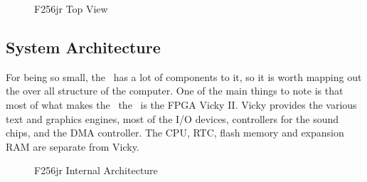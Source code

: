 \begin{figure}[ht]
    \begin{center}
    \end{center}
    \caption{F256jr Top View}
    \label{fig:top}
\end{figure}

\subsection*{System Architecture}

For being so small, the \foenix\ has a lot of components to it, so it
is worth mapping out the over all structure of the computer. One of
the main things to note is that most of what makes the \foenix\ the
\foenix\ is the FPGA Vicky II. Vicky provides the various text and
graphics engines, most of the I/O devices, controllers for the sound
chips, and the DMA controller. The CPU, RTC, flash memory and
expansion RAM are separate from Vicky.

\begin{figure}[ht]
    \begin{center}
    \end{center}
    \caption{F256jr Internal Architecture}
    \label{fig:arch}
\end{figure}
